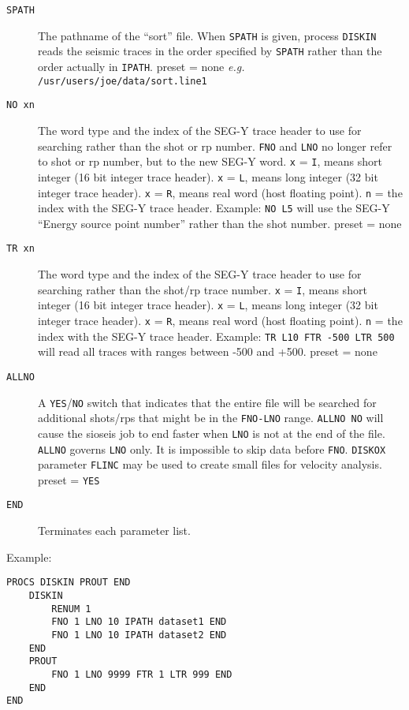 \begin{description}
\item[\texttt{SPATH}] The pathname of the ``sort'' file.  When \texttt{SPATH} is given, process \texttt{DISKIN} reads the seismic traces in the order specified by \texttt{SPATH} rather than the order actually in \texttt{IPATH}.  \Gls{preset} = none  \textit{e.g.} \texttt{/usr/users/joe/data/sort.line1}

\item[\texttt{NO  xn}] The word type and the index of the SEG-Y trace header to use for searching rather than the \gls{shot} or \gls{rp} number.  \texttt{FNO} and \texttt{LNO} no longer refer to \gls{shot} or \gls{rp} number, but to the new SEG-Y word.
     \texttt{x} = \texttt{I}, means short integer (16 bit integer trace header).
     \texttt{x} = \texttt{L}, means long integer (32 bit integer trace header).
     \texttt{x} = \texttt{R}, means real word (host floating point).
     \texttt{n} = the index with the SEG-Y trace header.
         Example:  \texttt{NO L5} will use the SEG-Y ``Energy source point number'' rather than the \gls{shot} number.  \Gls{preset} = none

\item[\texttt{TR  xn}] The word type and the index of the SEG-Y trace header to use for searching rather than the \gls{shot}/\gls{rp} trace number.
     \texttt{x} = \texttt{I}, means short integer (16 bit integer trace header).
     \texttt{x} = \texttt{L}, means long integer (32 bit integer trace header).
     \texttt{x} = \texttt{R}, means real word (host floating point).
     \texttt{n} = the index with the SEG-Y trace header.
         Example:  \texttt{TR L10  FTR -500 LTR 500} will read all traces with ranges between -500 and +500.  \Gls{preset} = none

     \item[\texttt{ALLNO}] A \texttt{YES}/\texttt{NO} switch that indicates that the entire file will be searched for additional \glspl{shot}/\glspl{rp} that might be in the \texttt{FNO-LNO} range.  \texttt{ALLNO NO} will cause the sioseis job to end faster when \texttt{LNO} is not at the end of the file.  \texttt{ALLNO} governs \texttt{LNO} only.  It is impossible to skip data before \texttt{FNO}.  \texttt{DISKOX} parameter \texttt{FLINC} may be used to create small files for velocity analysis.  \Gls{preset} = \texttt{YES}

\item[\texttt{END}] Terminates each parameter list.
\end{description}

Example:
\begin{verbatim}
PROCS DISKIN PROUT END
    DISKIN
        RENUM 1
        FNO 1 LNO 10 IPATH dataset1 END
        FNO 1 LNO 10 IPATH dataset2 END
    END
    PROUT
        FNO 1 LNO 9999 FTR 1 LTR 999 END
    END
END
\end{verbatim}

